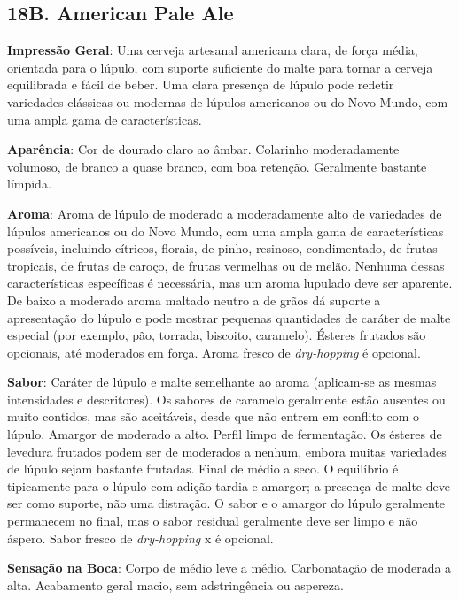 \subsection*{18B. American Pale Ale}

\textbf{Impressão Geral}: Uma cerveja artesanal americana clara, de força média, orientada para o lúpulo, com suporte suficiente do malte para tornar a cerveja equilibrada e fácil de beber. Uma clara presença de lúpulo pode refletir variedades clássicas ou modernas de lúpulos americanos ou do Novo Mundo, com uma ampla gama de características.

\textbf{Aparência}: Cor de dourado claro ao âmbar. Colarinho moderadamente volumoso, de branco a quase branco, com boa retenção. Geralmente bastante límpida.

\textbf{Aroma}: Aroma de lúpulo de moderado a moderadamente alto de variedades de lúpulos americanos ou do Novo Mundo, com uma ampla gama de características possíveis, incluindo cítricos, florais, de pinho, resinoso, condimentado, de frutas tropicais, de frutas de caroço, de frutas vermelhas ou de melão. Nenhuma dessas características específicas é necessária, mas um aroma lupulado deve ser aparente. De baixo a moderado aroma maltado neutro a de grãos dá suporte a apresentação do lúpulo e pode mostrar pequenas quantidades de caráter de malte especial (por exemplo, pão, torrada, biscoito, caramelo). Ésteres frutados são opcionais, até moderados em força. Aroma fresco de \textit{dry-hopping} é opcional.

\textbf{Sabor}: Caráter de lúpulo e malte semelhante ao aroma (aplicam-se as mesmas intensidades e descritores). Os sabores de caramelo geralmente estão ausentes ou muito contidos, mas são aceitáveis, desde que não entrem em conflito com o lúpulo. Amargor de moderado a alto. Perfil limpo de fermentação. Os ésteres de levedura frutados podem ser de moderados a nenhum, embora muitas variedades de lúpulo sejam bastante frutadas. Final de médio a seco. O equilíbrio é tipicamente para o lúpulo com adição tardia e amargor; a presença de malte deve ser como suporte, não uma distração. O sabor e o amargor do lúpulo geralmente permanecem no final, mas o sabor residual geralmente deve ser limpo e não áspero. Sabor fresco de \textit{dry-hopping} x  é opcional.

\textbf{Sensação na Boca}: Corpo de médio leve a médio. Carbonatação de moderada a alta. Acabamento geral macio, sem adstringência ou aspereza.

